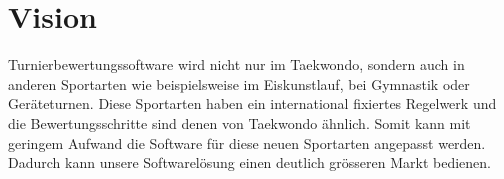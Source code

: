 \section{Vision}
Turnierbewertungssoftware wird nicht nur im Taekwondo, sondern auch in anderen Sportarten wie beispielsweise im Eiskunstlauf,
    bei Gymnastik oder Geräteturnen.
Diese Sportarten haben ein international fixiertes Regelwerk und die Bewertungsschritte sind denen von Taekwondo ähnlich.
Somit kann mit geringem Aufwand die Software für diese neuen Sportarten angepasst werden.
Dadurch kann unsere Softwarelösung einen deutlich grösseren Markt bedienen.

